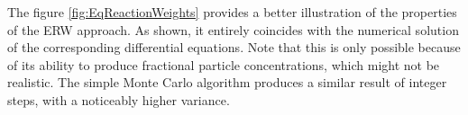 The figure \ref{fig:EqReactionWeights} provides a better illustration of the properties of the ERW approach. As shown, it entirely coincides with the numerical solution of the corresponding differential equations. Note that this is only possible because of its ability to produce fractional particle concentrations, which might not be realistic. The simple Monte Carlo algorithm produces a similar result of integer steps, with a noticeably higher variance.